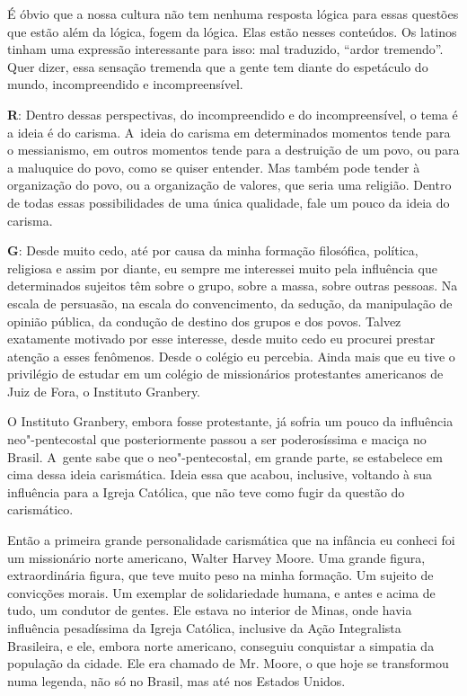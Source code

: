  

É óbvio que a nossa cultura não tem nenhuma resposta lógica para essas
questões que estão além da lógica, fogem da lógica. Elas estão nesses
conteúdos. Os latinos tinham uma expressão interessante para isso: mal
traduzido, ``ardor tremendo''. Quer dizer, essa sensação tremenda que a
gente tem diante do espetáculo do mundo, incompreendido e
incompreensível.

 

\textbf{R}: Dentro dessas perspectivas, do incompreendido e do
incompreensível, o tema é a ideia é do carisma. A~ideia do carisma em
determinados momentos tende para o messianismo, em outros momentos tende
para a destruição de um povo, ou para a maluquice do povo, como se
quiser entender. Mas também pode tender à organização do povo, ou a
organização de valores, que seria uma religião. Dentro de todas essas
possibilidades de uma única qualidade, fale um pouco da ideia do
carisma.

 

\textbf{G}: Desde muito cedo, até por causa da minha formação
filosófica, política, religiosa e assim por diante, eu sempre me
interessei muito pela influência que determinados sujeitos têm sobre o
grupo, sobre a massa, sobre outras pessoas. Na escala de persuasão, na
escala do convencimento, da sedução, da manipulação de opinião pública,
da condução de destino dos grupos e dos povos. Talvez exatamente
motivado por esse interesse, desde muito cedo eu procurei prestar
atenção a esses fenômenos. Desde o colégio eu percebia. Ainda mais que
eu tive o privilégio de estudar em um colégio de missionários
protestantes americanos de Juiz de Fora, o Instituto Granbery.

 

O Instituto Granbery, embora fosse protestante, já sofria um pouco da
influência neo"-pentecostal que posteriormente passou a ser poderosíssima
e maciça no Brasil. A~gente sabe que o neo"-pentecostal, em grande parte,
se estabelece em cima dessa ideia carismática. Ideia essa que acabou,
inclusive, voltando à sua influência para a Igreja Católica, que não teve
como fugir da questão do carismático.

 

Então a primeira grande personalidade carismática que na infância eu
conheci foi um missionário norte americano, Walter Harvey Moore. Uma
grande figura, extraordinária figura, que teve muito peso na minha
formação. Um sujeito de convicções morais. Um exemplar de solidariedade
humana, e antes e acima de tudo, um condutor de gentes. Ele estava no
interior de Minas, onde havia influência pesadíssima da Igreja Católica,
inclusive da Ação Integralista Brasileira, e ele, embora norte
americano, conseguiu conquistar a simpatia da população da cidade. Ele
era chamado de Mr. Moore, o que hoje se transformou numa legenda, não só
no Brasil, mas até nos Estados Unidos.

